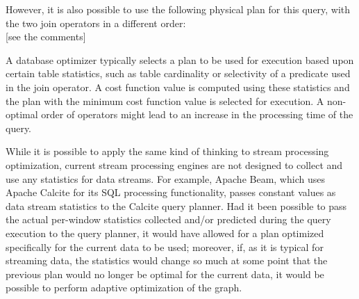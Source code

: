 
However, it is also possible to use the following physical plan for this query, with the two join operators in a different order: \\

[see the comments]


A database optimizer typically selects a plan to be used for execution based upon certain table statistics, such as table cardinality or selectivity of a predicate used in the join operator. A cost function value is computed using these statistics and the plan with the minimum cost function value is selected for execution. A non-optimal order of operators might lead to an increase in the processing time of the query. 


While it is possible to apply the same kind of thinking to stream processing optimization, current stream processing engines are not designed to collect and use any statistics for data streams. For example, Apache Beam, %
which uses Apache Calcite for its SQL processing functionality, passes constant values as data stream statistics to the Calcite query planner. Had it been possible to pass the actual per-window statistics collected and/or predicted during the query execution to the query planner, it would have allowed for a plan optimized specifically for the current data to be used; moreover, if, as it is typical for streaming data, the statistics would change so much at some point that the previous plan would no longer be optimal for the current data, it would be possible to perform adaptive optimization of the graph. %


